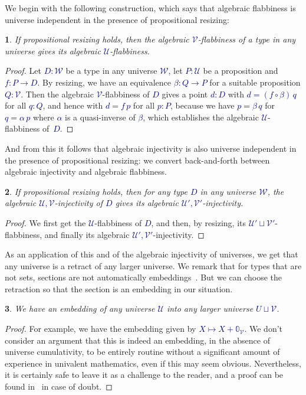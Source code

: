 \documentclass[10pt]{article}
\newcommand{\db}{\textcolor{darkblue}}
\newcommand{\m}[1]{\db{$#1$}}
\newcommand{\comp}{\mathrel{\circ}}
\newcommand{\U}{\mathcal{U}}
\newcommand{\V}{\mathcal{V}}
\newcommand{\W}{\mathcal{W}}
\newcommand{\Zero}{\mathbb{0}}
\newtheorem{numbered}{}
\theoremstyle{definition}
\begin{document}
We begin with the following construction, which says that algebraic
flabbiness is universe independent in the presence of propositional
resizing:

\begin{numbered}
  If propositional resizing holds, then the algebraic \m{\V}-flabbiness
  of a type in any universe gives its algebraic \m{\U}-flabbiness.
\end{numbered}
\begin{proof}
  Let \m{D:\W} be a type in any universe \m{\W}, let \m{P : \U} be a
  proposition and \m{f : P \to D}. By resizing, we have an equivalence
  \m{\beta : Q \to P} for a suitable proposition \m{Q:\V}.  Then the
  algebraic \m{\V}-flabbiness of \m{D} gives a point \m{d:D} with \m{d
    = (f \comp \beta) \, q} for all \m{q : Q}, and hence with \m{d = f
    \, p} for all \m{p : P}, because we have \m{p=\beta \, q} for \m{q
    = \alpha \, p} where \m{\alpha} is a quasi-inverse of \m{\beta},
  which establishes the algebraic \m{\U}-flabbiness of~\m{D}.
\end{proof}

And from this it follows that algebraic injectivity is also universe
independent in the presence of propositional resizing: we convert
back-and-forth between algebraic injectivity and algebraic flabbiness.

\begin{numbered} \label{universe:independence}
  If propositional resizing holds, then for any type \m{D} in any universe
  \m{\W}, the algebraic \m{\U,\V}-injectivity of \m{D} gives its
  algebraic \m{\U',\V'}-injectivity.
\end{numbered}
\begin{proof}
  We first get the \m{\U}-flabbiness of \m{D}, and then, by resizing, its
  \m{\U' \sqcup \V'}-flabbiness, and finally its algebraic
  \m{\U',\V'}-injectivity.
\end{proof}

As an application of this and of the algebraic injectivity of
universes, we get that any universe is a retract of any larger
universe.  We remark that for types that are not sets, sections are
not automatically embeddings~\cite{MR3548859}. But we can choose the
retraction so that the section is an embedding in our situation.

\begin{numbered}
  We have an embedding of any universe \m{\U} into any larger universe \m{U \sqcup \V}.
\end{numbered}
\begin{proof}
  For example, we have the embedding given by \m{X \mapsto X +
    \Zero_\V}. We don't consider an argument that this is indeed an
  embedding, in the absence of universe cumulativity, to be entirely
  routine without a significant amount of experience in univalent
  mathematics, even if this may seem obvious. Nevertheless, it is certainly
  safe to leave it as a challenge to the reader, and a proof can be
  found in~\cite{injective:article} in case of doubt.
\end{proof}
\end{document}
